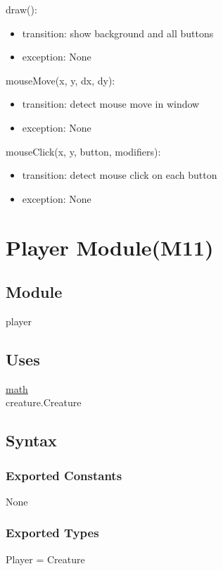 \documentclass{article}
\begin{document}
\noindent draw():
\begin{itemize}
\item transition: show background and all buttons
\item exception: None
\end{itemize}\vspace{6mm}

\noindent mouseMove(x, y, dx, dy):
\begin{itemize}
\item transition: detect mouse move in window
\item exception: None
\end{itemize}\vspace{6mm}

\noindent mouseClick(x, y, button, modifiers):
\begin{itemize}
\item transition: detect mouse click on each button
\item exception: None
\end{itemize}\vspace{6mm}

\newpage


\section {Player Module(M11)}

\subsection{Module}

player

\subsection {Uses}

\href{https://docs.python.org/3/library/math.html}{math}\\
creature.Creature

\subsection {Syntax}

\subsubsection {Exported Constants}
None

\subsubsection {Exported Types}
Player = Creature
\end{document}
